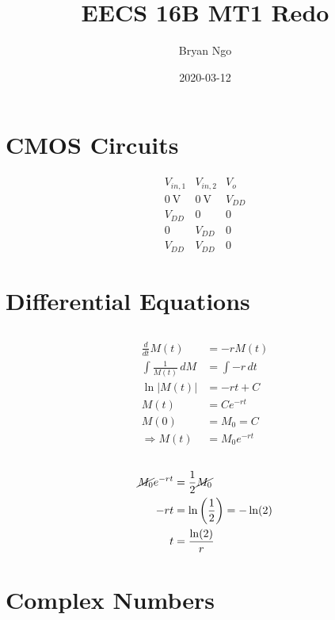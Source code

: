 \documentclass[]{article}
\title{EECS 16B MT1 Redo}
\author{Bryan Ngo}
\date{2020-03-12}
\newcommand{\diff}[1]{\frac{d}{d #1}}
\begin{document}
\maketitle

\section{CMOS Circuits}

\begin{equation}
	\begin{array}{c|c|l}
	V_{in, 1} & V_{in, 2} & V_o \\
	\hline
	\SI{0}{\volt} & \SI{0}{\volt} & V_{DD} \\
	V_{DD} & 0 & 0 \\
	0 & V_{DD} & 0 \\
	V_{DD} & V_{DD} & 0
	\end{array}
\end{equation}

\section{Differential Equations}

\subsection{}

\begin{align}
	\diff{t} M(t) &= -r M(t) \\
	\int \frac{1}{M(t)} \, dM &= \int -r \, dt \\
	\ln|M(t)| &= -rt + C \\
	M(t) &= Ce^{-rt} \\
	M(0) &= M_0 = C \\
	\Rightarrow M(t) &= M_0 e^{-rt}
\end{align}

\subsection{}

\begin{align}
	\cancel{M_0} e^{-rt} &= \frac{1}{2} \cancel{M_0} \\
	-rt &= \ln\left(\frac{1}{2}\right) = -\ln(2) \\
	t &= \frac{\ln(2)}{r}
\end{align}

\section{Complex Numbers}
\end{document}
